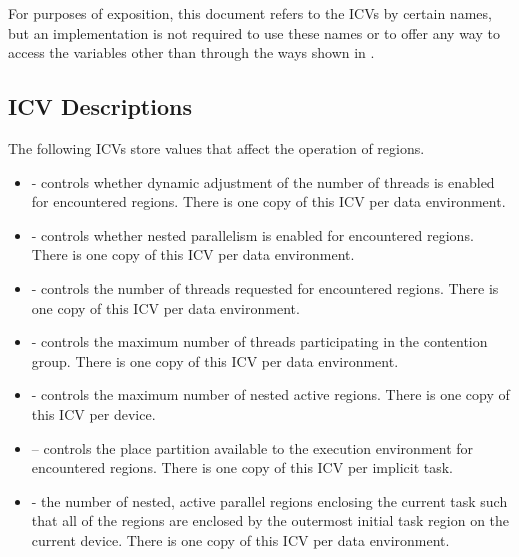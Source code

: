 For purposes of exposition, this document refers to the ICVs by certain names, but an 
implementation is not required to use these names or to offer any way to access the 
variables other than through the ways shown in 
.








\subsection{ICV Descriptions}
\label{subsec:ICV Descriptions}
The following ICVs store values that affect the operation of  regions.

\begin{itemize}
\item {} - controls whether dynamic adjustment of the number of threads is enabled 
for encountered  regions. There is one copy of this ICV per data 
environment. 

\item {} - controls whether nested parallelism is enabled for encountered  
regions. There is one copy of this ICV per data environment. 

\item {} - controls the number of threads requested for encountered  
regions. There is one copy of this ICV per data environment. 

\item {} - controls the maximum number of threads participating in the 
contention group. There is one copy of this ICV per data environment. 

\item {} - controls the maximum number of nested active  
regions. There is one copy of this ICV per device.

\item {} – controls the place partition available to the execution 
environment for encountered  regions. There is one copy of this ICV per 
implicit task.

\item {} - the number of nested, active parallel regions enclosing the current 
task such that all of the  regions are enclosed by the outermost initial task 
region on the current device. There is one copy of this ICV per data environment.


\end{itemize}
